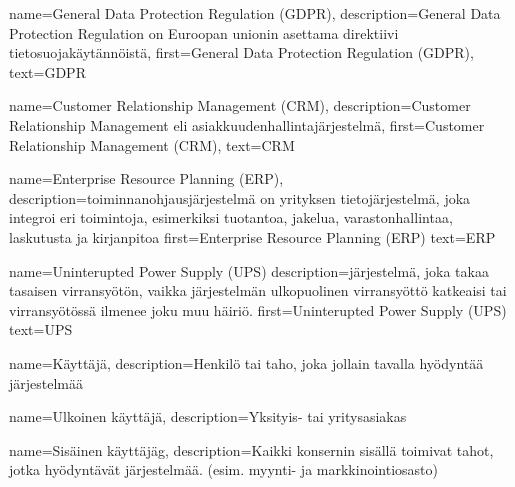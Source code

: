 %
%
%

\makeglossaries



    {
    name={General Data Protection Regulation (GDPR)},
	description={General Data Protection Regulation on Euroopan unionin asettama direktiivi tietosuojakäytännöistä},
	first={General Data Protection Regulation (GDPR)},
	text={GDPR}
    }

    {
	name={Customer Relationship Management (CRM)},
	description={Customer Relationship Management eli asiakkuudenhallintajärjestelmä},
	first={Customer Relationship Management (CRM)},
	text={CRM}
    }

    {
    name={Enterprise Resource Planning (ERP)},
    description={toiminnanohjausjärjestelmä on yrityksen tietojärjestelmä, joka integroi eri toimintoja, esimerkiksi tuotantoa, jakelua, varastonhallintaa, laskutusta ja kirjanpitoa}
    first={Enterprise Resource Planning (ERP)}
    text={ERP}
    }

    {
    name={Uninterupted Power Supply (UPS)}
    description={järjestelmä, joka takaa tasaisen virransyötön, vaikka järjestelmän ulkopuolinen virransyöttö katkeaisi tai virransyötössä ilmenee joku muu häiriö.}
    first={Uninterupted Power Supply (UPS)}
    text={UPS}
    }

    {
    name={Käyttäjä},
    description={Henkilö tai taho, joka jollain tavalla hyödyntää järjestelmää}
    }

    {
    name={Ulkoinen käyttäjä},
    description={Yksityis- tai yritysasiakas}
    }

    {
    name={Sisäinen käyttäjäg},
    description={Kaikki konsernin sisällä toimivat tahot, jotka hyödyntävät järjestelmää. (esim. myynti- ja markkinointiosasto)}
    }

